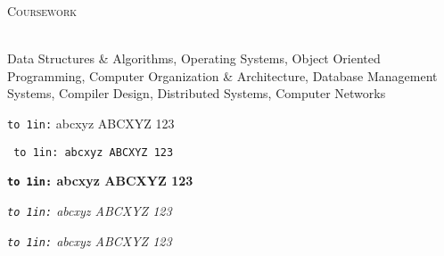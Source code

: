 \documentclass[a4paper]{article}
\newcommand{\lineunder} {
    \vspace*{-8pt} \\
    \hspace*{-15pt} \hrulefill \\
}
\newcommand{\header} [1] {
    {\hspace*{-18pt}\vspace*{6pt} {
        \fontfamily{qcs}\selectfont \large \scshape #1
    }}
    \vspace*{-6pt} \lineunder
    \vspace{0.5mm}
}
\begin{document}
\header{Coursework}
Data Structures \& Algorithms,
Operating Systems,
Object Oriented Programming,
Computer Organization \& Architecture,
Database Management Systems,
Compiler Design,
Distributed Systems,
Computer Networks

\def\samplefont#1{%
    #1\edef\savedname{\fontname\font}%
    {\leavevmode\tt\hbox to 1in{\savedname:\hss}}%
    abcxyz ABCXYZ 123\par
}
\samplefont\rm
\samplefont\tt
\samplefont\bf
\samplefont\it
\samplefont\sl
\end{document}
